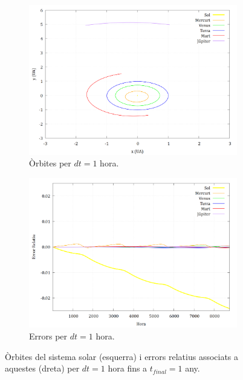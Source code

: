 \documentclass[10pt, twoside, a4paper]{article}
\begin{document}
\begin{figure}[h]
    \centering
    
    \begin{subfigure}[b]{0.495\linewidth}
        \centering
        \includegraphics[width=\linewidth]{../sist_solar/orbites_euler_1_d1hora.png}
        \caption{Òrbites per $dt=1$ hora.}
    \end{subfigure}
    \hfill
    \begin{subfigure}[b]{0.495\linewidth}
        \centering
        \includegraphics[width=\linewidth]{../Error/error_1_hora.png}
        \caption{Errors per $dt=1$ hora.}
    \end{subfigure}
    \caption{Òrbites del sistema solar (esquerra) i errors relatius associats a aquestes (dreta) per $dt=1$ hora fins a $t_{final}=1$ any.}
    \label{fig2}
\end{figure}
\end{document}
